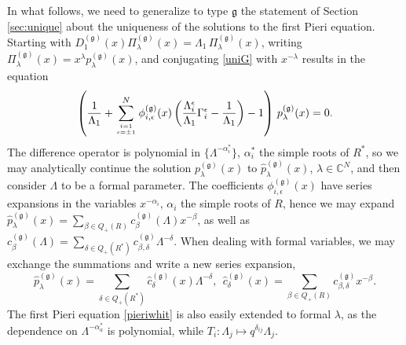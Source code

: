 \documentclass[12pt]{amsart}
\newcommand{\g}{{\mathfrak{g}}}
\newcommand{\C}{{\mathbb C}}
\newcommand{\al}{{\alpha}}
\newcommand{\lL}{{\Lambda}}
\numberwithin{equation}{section}
\begin{document}
%
In what follows, we need to generalize to type $\g$ the statement of Section \ref{sec:unique} about the uniqueness of the solutions to the first Pieri equation. Starting with
$D_1^{(\g)}(x) \Pi_\lambda^{(\g)}(x)=\lL_1\, \Pi_\lambda^{(\g)}(x)$, writing $\Pi_\lambda^{(\g)}(x)=x^\lambda p_\lambda^{(\g)}(x)$, and
conjugating \eqref{uniG} with $x^{-\lambda}$ results in the equation
$$ \left(\frac{1}{\lL_1}+\sum_{i=1\atop \epsilon=\pm 1}^N \phi_{i,\epsilon}^{(\g)}(x) 
\left(\frac{\lL_i^\epsilon}{\lL_1} \Gamma_i^\epsilon -\frac{1}{\lL_1}\right)-1\right)\, p_\lambda^{(\g)}(x)=0 .$$
The difference operator is polynomial in $\{\lL^{-\al_i^*}\}$, $\al_i^*$ the simple roots of $R^*$, so we may analytically continue the solution 
$p_\lambda^{(\g)}(x)$ to $\hat p_\lambda^{(\g)}(x)$, $\lambda\in \C^N$, 
and then consider $\Lambda$ to be a formal parameter. The coefficients $\phi_{i,\epsilon}^{(\g)}(x)$ have series expansions 
in the variables $x^{-\al_i}$, $\al_i$ the simple roots of $R$, hence we may expand $\hat p_\lambda^{(\g)}(x)=\sum_{\beta\in Q_+(R)} c_\beta^{(\g)}(\lL)x^{-\beta}$, as well as $c_\beta^{(\g)}(\lL)= \sum_{\delta\in Q_+(R^*)} c_{\beta,\delta}^{(\g)} \lL^{-\delta}$. When dealing with formal variables, we may exchange the summations and write a new series expansion,
$$ \hat p_\lambda^{(\g)}(x)= \sum_{\delta\in Q_+(R^*)} \hat c_\delta^{(\g)}(x) \lL^{-\delta}, \ \ \hat c_\delta^{(\g)}(x)=\sum_{\beta\in Q_+(R)} c_{\beta,\delta}^{(\g)} x^{-\beta} .$$
The first Pieri equation \eqref{pieriwhit} is also easily extended to formal $\lambda$, as the 
dependence on $\lL^{-\alpha_a^*}$ is polynomial, while $T_i: \Lambda_j\mapsto q^{\delta_{ij}}\Lambda_j$.
\end{document}
